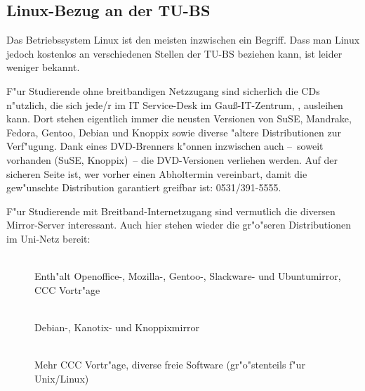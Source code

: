 \subsection{Linux-Bezug an der TU-BS}


Das Betriebssystem Linux ist den meisten inzwischen ein Begriff. Dass man Linux 
jedoch kostenlos an verschiedenen Stellen der TU-BS beziehen kann, ist leider 
weniger bekannt.

F"ur Studierende ohne breitbandigen Netzzugang sind sicherlich die CDs 
n"utzlich, die sich jede/r im
IT Service-Desk
im Gauß-IT-Zentrum, , ausleihen kann. Dort stehen eigentlich
immer die neusten Versionen von SuSE, Mandrake, Fedora, Gentoo, Debian und Knoppix
sowie diverse "altere Distributionen zur Verf"ugung. Dank eines DVD-Brenners
k"onnen inzwischen auch --~soweit vorhanden (SuSE, Knoppix)~-- die
DVD-Versionen verliehen werden. Auf der sicheren Seite ist, wer vorher einen
Abholtermin vereinbart, damit die gew"unschte Distribution garantiert greifbar
ist: 0531/391-5555.

F"ur Studierende mit Breitband-Internetzugang sind vermutlich die diversen 
Mirror-Server interessant. Auch hier stehen wieder die gr"o"seren 
Distributionen im Uni-Netz bereit:
	  
\begin{description}
\item[]~\\Enth"alt Openoffice-, Mozilla-,
Gentoo-, Slackware- und Ubuntumirror, CCC Vortr"age
\item[]~\\Debian-, Kanotix- und Knoppixmirror
\item[]~\\Mehr CCC Vortr"age, diverse freie
Software (gr"o"stenteils f"ur Unix/Linux)
\end{description}


